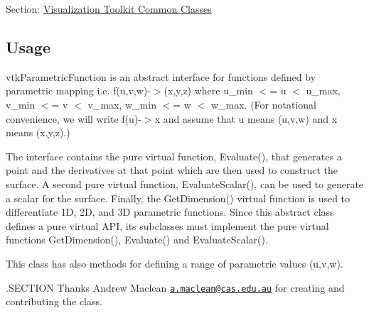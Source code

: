 Section\-: \hyperlink{sec_vtkcommon}{Visualization Toolkit Common Classes} \hypertarget{vtkwidgets_vtkxyplotwidget_Usage}{}\subsection{Usage}\label{vtkwidgets_vtkxyplotwidget_Usage}
vtk\-Parametric\-Function is an abstract interface for functions defined by parametric mapping i.\-e. f(u,v,w)-\/$>$(x,y,z) where u\-\_\-min $<$= u $<$ u\-\_\-max, v\-\_\-min $<$= v $<$ v\-\_\-max, w\-\_\-min $<$= w $<$ w\-\_\-max. (For notational convenience, we will write f(u)-\/$>$x and assume that u means (u,v,w) and x means (x,y,z).)

The interface contains the pure virtual function, Evaluate(), that generates a point and the derivatives at that point which are then used to construct the surface. A second pure virtual function, Evaluate\-Scalar(), can be used to generate a scalar for the surface. Finally, the Get\-Dimension() virtual function is used to differentiate 1\-D, 2\-D, and 3\-D parametric functions. Since this abstract class defines a pure virtual A\-P\-I, its subclasses must implement the pure virtual functions Get\-Dimension(), Evaluate() and Evaluate\-Scalar().

This class has also methods for defining a range of parametric values (u,v,w).

.S\-E\-C\-T\-I\-O\-N Thanks Andrew Maclean \href{mailto:a.maclean@cas.edu.au}{\tt a.\-maclean@cas.\-edu.\-au} for creating and contributing the class.


